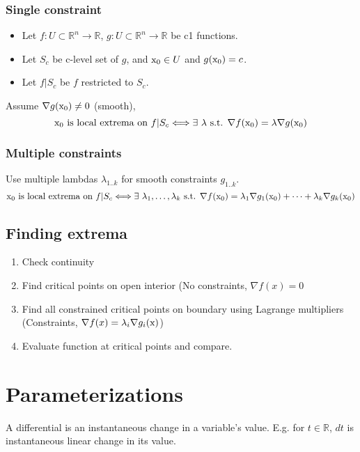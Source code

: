 \subsection*{Single constraint}
\begin{itemize}
    \itemsep 0em
    \item Let $f:U\subset\mathbb{R}^n\to \mathbb{R}$,  $g:U\subset\mathbb{R}^n\to\mathbb{R}$ be c1 functions.
    \item Let $S_c$ be c-level set of $g$, and $\textrm{x}_0 \in U$ and $g(\textrm{x}_0)=c$.
    \item Let $f|S_c$ be $f$ restricted to $S_c$.
\end{itemize}
Assume $\nabla g(\textrm{x}_0)\neq 0$ (smooth),
$$\textrm{x}_0 \textrm{ is local extrema on } f|S_c \Longleftrightarrow \exists~\lambda \textrm{ s.t. } \nabla f(\textrm{x}_0) = \lambda \nabla g(\textrm{x}_0)$$
\subsection*{Multiple constraints}
Use multiple lambdas $\lambda_{1..k}$ for smooth constraints $g_{1..k}$.
$$\textrm{x}_0 \textrm{ is local extrema on } f|S_c \Longleftrightarrow \exists~\lambda_1,\ldots,\lambda_k \textrm{ s.t. } \nabla f(\textrm{x}_0) = \lambda_1 \nabla g_1(\textrm{x}_0) + \dots + \lambda_k \nabla g_k(\textrm{x}_0)$$

\section*{Finding extrema}
\begin{enumerate}
    \itemsep 0em
    \item Check continuity
    \item Find critical points on open interior (No constraints, $\nabla f(x) = 0$
    \item Find all constrained critical points on boundary using Lagrange multipliers (Constraints, $\nabla f(x) = \lambda_i \nabla g_i(\textrm{x})$)
    \item Evaluate function at critical points and compare.
\end{enumerate}{}

\chapter*{Parameterizations}
A differential is an instantaneous change in a variable's value. E.g. for $t \in \mathbb{R}$, $dt$ is instantaneous linear change in its value.
